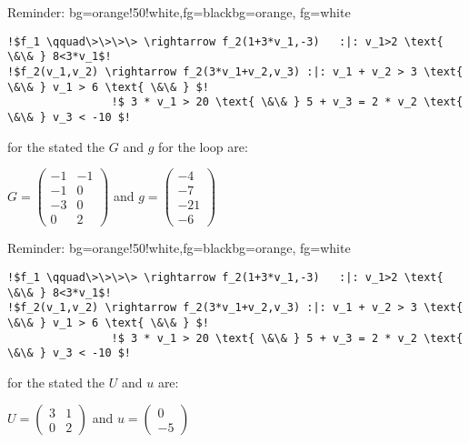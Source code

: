 \begin{frame}[fragile]
	\begin{variableblock}{Reminder: \its}{bg=orange!50!white,fg=black}{bg=orange, fg=white}
		\begin{lstlisting}[linewidth=10.5cm, escapechar = !]
!$f_1 \qquad\>\>\>\> \rightarrow f_2(1+3*v_1,-3)   :|: v_1>2 \text{ \&\& } 8<3*v_1$!
!$f_2(v_1,v_2) \rightarrow f_2(3*v_1+v_2,v_3) :|: v_1 + v_2 > 3 \text{ \&\& } v_1 > 6 \text{ \&\& } $!
				!$ 3 * v_1 > 20 \text{ \&\& } 5 + v_3 = 2 * v_2 \text{ \&\& } v_3 < -10 $!
		\end{lstlisting}
	\end{variableblock}
	\begin{example}[\guardmatrix, \guardconstants]
		for the stated \its the \guardconstants $G$ and \guardconstants $g$ for the loop are:\newline
		\begin{center}
			\vspace{-2em}
			$G = \begin{pmatrix} -1 & -1 \\ -1 & 0 \\ -3 & 0 \\ 0 & 2 \end{pmatrix}$ and $g= \begin{pmatrix} -4 \\ -7 \\ -21 \\ -6 \end{pmatrix}$
		\end{center}		
	\end{example}
\end{frame}

\begin{frame}[fragile]
	\begin{variableblock}{Reminder: \its}{bg=orange!50!white,fg=black}{bg=orange, fg=white}
		\begin{lstlisting}[linewidth=10.5cm, escapechar = !]
!$f_1 \qquad\>\>\>\> \rightarrow f_2(1+3*v_1,-3)   :|: v_1>2 \text{ \&\& } 8<3*v_1$!
!$f_2(v_1,v_2) \rightarrow f_2(3*v_1+v_2,v_3) :|: v_1 + v_2 > 3 \text{ \&\& } v_1 > 6 \text{ \&\& } $!
				!$ 3 * v_1 > 20 \text{ \&\& } 5 + v_3 = 2 * v_2 \text{ \&\& } v_3 < -10 $!
		\end{lstlisting}
	\end{variableblock}
		\begin{example}[\updatematrix, \updateconstants]
			for the stated \its the \updatematrix $U$ and \updateconstants $u$ are:\newline
			\begin{center}
				\vspace{-2em}
				$U = \begin{pmatrix} 3 & 1 \\ 0 & 2 \end{pmatrix}$ and $u = \begin{pmatrix} 0 \\ -5 \end{pmatrix}$
			\end{center}		
		\end{example}
\end{frame}

